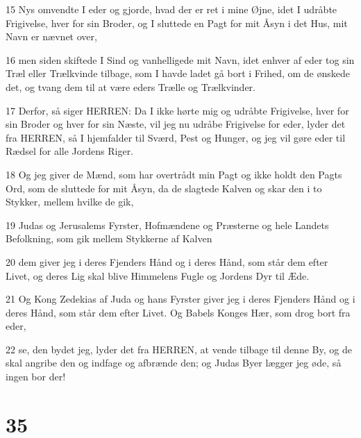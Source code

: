 \par 15 Nys omvendte I eder og gjorde, hvad der er ret i mine Øjne, idet I udråbte Frigivelse, hver for sin Broder, og I sluttede en Pagt for mit Åsyn i det Hus, mit Navn er nævnet over,
\par 16 men siden skiftede I Sind og vanhelligede mit Navn, idet enhver af eder tog sin Træl eller Trælkvinde tilbage, som I havde ladet gå bort i Frihed, om de ønskede det, og tvang dem til at være eders Trælle og Trælkvinder.
\par 17 Derfor, så siger HERREN: Da I ikke hørte mig og udråbte Frigivelse, hver for sin Broder og hver for sin Næste, vil jeg nu udråbe Frigivelse for eder, lyder det fra HERREN, så I hjemfalder til Sværd, Pest og Hunger, og jeg vil gøre eder til Rædsel for alle Jordens Riger.
\par 18 Og jeg giver de Mænd, som har overtrådt min Pagt og ikke holdt den Pagts Ord, som de sluttede for mit Åsyn, da de slagtede Kalven og skar den i to Stykker, mellem hvilke de gik,
\par 19 Judas og Jerusalems Fyrster, Hofmændene og Præsterne og hele Landets Befolkning, som gik mellem Stykkerne af Kalven
\par 20 dem giver jeg i deres Fjenders Hånd og i deres Hånd, som står dem efter Livet, og deres Lig skal blive Himmelens Fugle og Jordens Dyr til Æde.
\par 21 Og Kong Zedekias af Juda og hans Fyrster giver jeg i deres Fjenders Hånd og i deres Hånd, som står dem efter Livet. Og Babels Konges Hær, som drog bort fra eder,
\par 22 se, den bydet jeg, lyder det fra HERREN, at vende tilbage til denne By, og de skal angribe den og indfage og afbrænde den; og Judas Byer lægger jeg øde, så ingen bor der!

\chapter{35}

